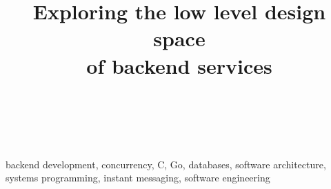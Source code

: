 \documentclass[journal]{IEEEtran}
\begin{document}
\title{Exploring the low level design space \\of backend services}

\author{\\
\\
}

\maketitle


\begin{IEEEkeywords}
backend development, concurrency, C, Go, databases, software architecture, systems programming, instant messaging, software engineering
\end{IEEEkeywords}





%



\nocite{*}

\end{document}
